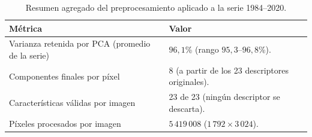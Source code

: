 \begin{table}[h]
\centering
\caption{Resumen agregado del preprocesamiento aplicado a la serie 1984--2020.}
\begin{tabularx}{\textwidth}{|>{\raggedright\arraybackslash}p{}|X|}
\hline
	\textbf{Métrica} & \textbf{Valor} \\
\hline
Varianza retenida por PCA (promedio de la serie) & $96{,}1$\% (rango $95{,}3$--$96{,}8$\%). \\
Componentes finales por píxel & 8 (a partir de los 23 descriptores originales). \\
Características válidas por imagen & 23 de 23 (ningún descriptor se descarta). \\
Píxeles procesados por imagen & $5\,419\,008$ ($1\,792 \times 3\,024$). \\
\hline
\end{tabularx}
\label{tab:preprocessing_quality}
\end{table}
